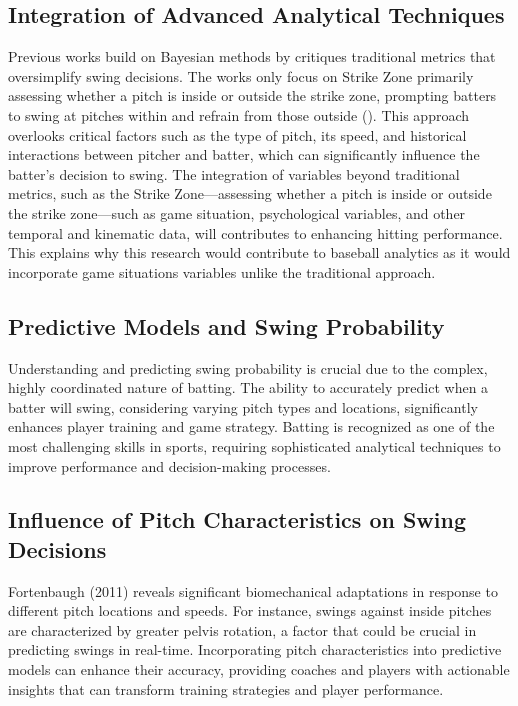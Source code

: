 \documentclass[12pt]{article}
\begin{document}
\subsection{Integration of Advanced Analytical Techniques}
Previous works build on Bayesian methods by \cite{Deshpande2023} critiques traditional metrics that oversimplify swing decisions. The works only focus on Strike Zone primarily assessing whether a pitch is inside or outside the strike zone, prompting batters to swing at pitches within and refrain from those outside (\cite{Slowinski2010}). This approach overlooks critical factors such as the type of pitch, its speed, and historical interactions between pitcher and batter, which can significantly influence the batter’s decision to swing. The integration of variables beyond traditional metrics, such as the Strike Zone—assessing whether a pitch is inside or outside the strike zone—such as game situation, psychological variables, and other temporal and kinematic data, will contributes to enhancing hitting performance. This explains why this research would contribute to baseball analytics as it would incorporate game situations variables unlike the traditional approach.

\subsection{Predictive Models and Swing Probability}
Understanding and predicting swing probability is crucial due to the complex, highly coordinated nature of batting. The ability to accurately predict when a batter will swing, considering varying pitch types and locations, significantly enhances player training and game strategy. Batting is recognized as one of the most challenging skills in sports, requiring sophisticated analytical techniques to improve performance and decision-making processes.

\subsection{Influence of Pitch Characteristics on Swing Decisions}
Fortenbaugh (2011) reveals significant biomechanical adaptations in response to different pitch locations and speeds. For instance, swings against inside pitches are characterized by greater pelvis rotation, a factor that could be crucial in predicting swings in real-time. Incorporating pitch characteristics into predictive models can enhance their accuracy, providing coaches and players with actionable insights that can transform training strategies and player performance.
\end{document}

